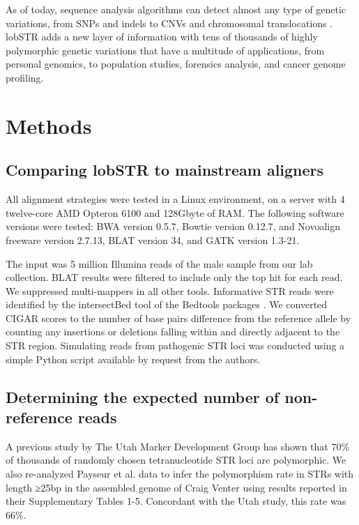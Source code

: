 As of today, sequence analysis algorithms can detect almost any type of genetic variations, from SNPs \cite{GoyaSunMorinEtAl2010} and indels \cite{KoboldtChenWylieEtAl2009,GoyaSunMorinEtAl2010} to CNVs and chromosomal translocations \cite{ChenWallisMcLellanEtAl2009}. lobSTR adds a new layer of information with tens of thousands of highly polymorphic genetic variations that have a multitude of applications, from personal genomics, to population studies, forensics analysis, and cancer genome profiling.

\section{Methods}
\label{sec:lobmethods}
\subsection{Comparing lobSTR to mainstream aligners}
All alignment strategies were tested in a Linux environment, on a server with 4 twelve-core AMD Opteron 6100 and 128Gbyte of RAM. The following software versions were tested: BWA version 0.5.7, Bowtie version 0.12.7, and Novoalign freeware version 2.7.13, BLAT version 34, and GATK version 1.3-21.

The input was 5 million Illumina reads of the male sample from our lab collection. BLAT results were filtered to include only the top hit for each read. We suppressed multi-mappers in all other tools. Informative STR reads were identified by the intersectBed tool of the Bedtools packages \cite{QuinlanHall2010}. We converted CIGAR scores to the number of base pairs difference from the reference allele by counting any insertions or deletions falling within and directly adjacent to the STR region. Simulating reads from pathogenic STR loci was conducted using a simple Python script available by request from the authors. 

\subsection{Determining the expected number of non-reference reads}

A previous study by The Utah Marker Development Group has shown that 70\% of thousands of randomly chosen tetranucleotide STR loci are polymorphic. We also re-analyzed Payseur et al. data to infer the polymorphism rate in STRs with length ≥25bp in the assembled genome of Craig Venter using results reported in their Supplementary Tables 1-5. Concordant with the Utah study, this rate was 66\%.

